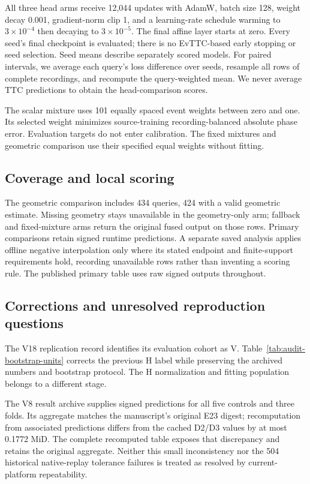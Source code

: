 All three head arms receive 12,044 updates with AdamW, batch size 128, weight decay 0.001, gradient-norm clip 1, and a learning-rate schedule warming to $3\times10^{-4}$ then decaying to $3\times10^{-5}$. The final affine layer starts at zero. Every seed's final checkpoint is evaluated; there is no EvTTC-based early stopping or seed selection. Seed means describe separately scored models. For paired intervals, we average each query's loss difference over seeds, resample all rows of complete recordings, and recompute the query-weighted mean. We never average TTC predictions to obtain the head-comparison scores.

The scalar mixture uses 101 equally spaced event weights between zero and one. Its selected weight minimizes source-training recording-balanced absolute phase error. Evaluation targets do not enter calibration. The fixed mixtures and geometric comparison use their specified equal weights without fitting.

\subsection{Coverage and local scoring}
The geometric comparison includes 434 queries, 424 with a valid geometric estimate. Missing geometry stays unavailable in the geometry-only arm; fallback and fixed-mixture arms return the original fused output on those rows. Primary comparisons retain signed runtime predictions. A separate saved analysis applies offline negative interpolation only where its stated endpoint and finite-support requirements hold, recording unavailable rows rather than inventing a scoring rule. The published primary table uses raw signed outputs throughout.

\subsection{Corrections and unresolved reproduction questions}
The V18 replication record identifies its evaluation cohort as V. Table~\ref{tab:audit-bootstrap-units} corrects the previous H label while preserving the archived numbers and bootstrap protocol. The H normalization and fitting population belongs to a different stage.

The V8 result archive supplies signed predictions for all five controls and three folds. Its aggregate matches the manuscript's original E23 digest; recomputation from associated predictions differs from the cached D2/D3 values by at most 0.1772 MiD. The complete recomputed table exposes that discrepancy and retains the original aggregate. Neither this small inconsistency nor the 504 historical native-replay tolerance failures is treated as resolved by current-platform repeatability.

